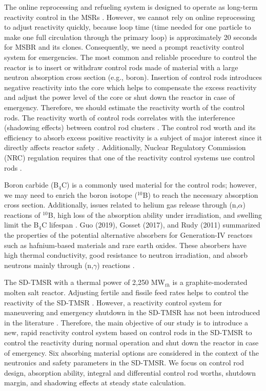 The online reprocessing and refueling system is designed to operate as long-term reactivity control in the MSRs \cite{ashraf2019modeling,ashraf2019Preliminary}. However, we cannot rely on online reprocessing to adjust reactivity quickly, because loop time (time needed for one particle to make one full circulation through the primary loop) is approximately 20 seconds for MSBR and its clones. Consequently, we need a prompt reactivity control system for emergencies. The most common and reliable procedure to control the reactor is to insert or withdraw control rods made of material with a large neutron absorption cross section (e.g., boron).
Insertion of control rods introduces negative reactivity into the 
core which helps to compensate the excess reactivity and 
adjust the power level of the core or shut down the reactor in case of 
emergency. Therefore, we should estimate 
the reactivity worth of the control rods.
The reactivity worth of control rods correlates with the interference 
(shadowing effects) between control rod clusters 
\cite{vcerba2017optimization}. 
The control rod worth and its efficiency to absorb excess positive reactivity is a subject of major interest since it directly affects reactor safety \cite{atkinson2019small}. Additionally, Nuclear Regulatory Commission (NRC) regulation requires that one of the reactivity control systems use control rods \cite{nuclear1987standard}.

Boron carbide (B$_4$C) is a commonly used material for the control rods; 
however, we may need to enrich the boron isotope ($^{10}$B) to reach 
the necessary absorption cross section. Additionally, issues related to helium gas release through (n,$\alpha$) reactions of $^{10}$B, high loss of the absorption ability under irradiation, and swelling limit the B$_4$C lifespan 
\cite{guo2019optimized}. Guo (2019), Gosset (2017), and Rudy (2011) summarized the properties of the 
potential alternative absorbers for Generation-IV reactors such as 
hafnium-based materials and rare earth oxides. These absorbers have 
high thermal conductivity, good resistance to neutron irradiation, and
absorb neutrons mainly through (n,$\gamma$) reactions
\cite{guo2019optimized}.

The SD-TMSR with a thermal power of 2,250 MW$_{th}$ 
\cite{li_optimization_2018} is a graphite-moderated 
molten salt reactor. Adjusting fertile and fissile feed rates helps to control the reactivity of 
the SD-TMSR \cite{ashraf2020Strategies,li_optimization_2018}. However, a reactivity control system for maneuvering and emergency shutdown in the SD-TMSR has not been introduced in the literature \cite{li_optimization_2018,zou2018transition,zhang2020radiotoxicity}. Therefore, the main objective of our study is to introduce a new, 
rapid reactivity control system based on control rods in the SD-TMSR to control 
the reactivity during normal operation and shut down the reactor in case of 
emergency. Six absorbing material options are considered in the context of the 
neutronics and safety parameters in the SD-TMSR. We 
focus on control rod design, absorption ability, integral and differential 
control rod worths, shutdown margin, and shadowing 
effects at steady state calculation.

